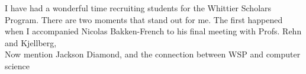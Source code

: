 \documentclass[../../../main.tex]{subfiles}
\begin{document}
I have had a wonderful time recruiting students for the Whittier Scholars Program.  There are two moments that stand out for me.  The first happened when I accompanied Nicolas Bakken-French to his final meeting with Profs. Rehn and Kjellberg, 
\\
\vspace{0.25cm}
Now mention Jackson Diamond, and the connection between WSP and computer science
\end{document}
